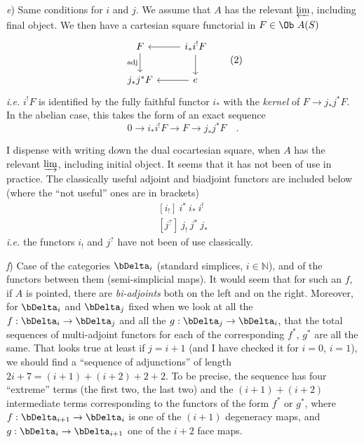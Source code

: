 \textit{e}) Same conditions for $i$ and $j$. We assume that $A$ has the relevant $\varprojlim$, including final object. We then have a cartesian square functorial in $F\in \Ob\ A(S)$ 
\[
\begin{tikzcd}
F \arrow[d, "\text{adj}"'] & i_{*}i^{!}F \arrow[l] \arrow[d] \\
j_{*}j^{*}F & e \arrow[l]
\end{tikzcd}
\tag*{(2)}
\]
\textit{i.e.} $i^{!}F$ is identified by the fully faithful functor $i_{*}$ with the \textit{kernel} of $F\to j_{*}j^{*}F$. In the abelian case, this takes the form of an exact sequence
\[
0 \longrightarrow i_{*}i^{!}F \longrightarrow F \longrightarrow j_{*}j^{*}F \quad .
\]

\clearpage



I dispense with writing down the dual cocartesian square, when $A$ has the relevant $\varinjlim$, including initial object. It seems that it has not been of use in practice. The classically useful adjoint and biadjoint functors are included below (where the ``not useful'' ones are in brackets)
\[
\begin{aligned}
{}[i_{!}]\ i^{*}\ i_{*}\ i^{!} \\
[j^{?}]\ j_{!}\ j^{*}\ j_{*}
\end{aligned}
\]
\textit{i.e.} the functors $i_{!}$ and $j^{?}$ have not been of use classically.

\textit{f}) Case of the categories $\bDelta_{i}$ (standard simplices, $i\in\mathbb{N}$), and of the functors between them (semi-simplicial maps). It would seem that for such an $f$, if $A$ is pointed, there are \textit{bi-adjoints} both on the left and on the right. Moreover, for $\bDelta_{i}$ and $\bDelta_{j}$ fixed when we look at all the $f:\bDelta_{i}\to\bDelta_{j}$ and all the $g:\bDelta_{j}\to\bDelta_{i}$, that the total sequences of multi-adjoint functors for each of the corresponding $f^{*}$, $g^{*}$ are all the same. That looks true at least if $j=i+1$ (and I have checked it for $i=0$, $i=1$), we should find a ``sequence of adjunctions'' of length $2i+7=(i+1)+(i+2)+2+2$. To be precise, the sequence has four ``extreme'' terms (the first two, the last two) and the $(i+1)+(i+2)$ intermediate terms corresponding to the functors of the form $f^{*}$ or $g^{*}$, where $f:\bDelta_{i+1}\to\bDelta_{i}$ is one of the $(i+1)$ degeneracy maps, and $g:\bDelta_{i}\to\bDelta_{i+1}$ one of the $i+2$ face maps.
